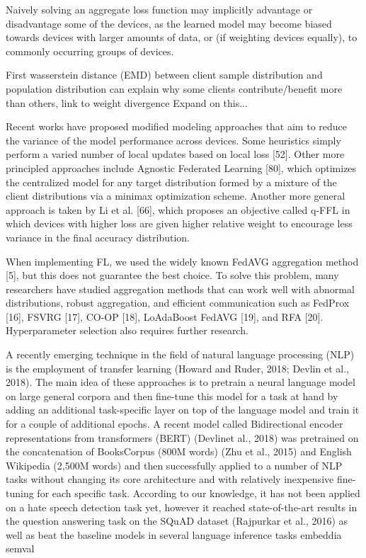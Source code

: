 \documentclass[letterpaper]{article} %
\begin{document}
Naively solving an aggregate loss function may implicitly advantage or disadvantage some of the devices, as the learned model may become biased towards devices with larger amounts of data, or (if weighting devices equally), to commonly occurring groups of devices. 

First wasserstein distance (EMD) between client sample distribution and population distribution can explain why some clients contribute/benefit more than others, link to weight divergence Expand on this...

Recent works have proposed modified modeling approaches that aim to reduce the variance of the model performance across devices. Some heuristics simply perform a varied number of local updates based
on local loss [52]. Other more principled approaches include Agnostic Federated Learning [80], which optimizes the centralized model for any target distribution formed by a mixture of the client distributions via a minimax optimization scheme. Another more general approach is taken by Li et al. [66], which proposes an objective called q-FFL in which devices with higher loss are given higher relative weight to encourage less variance in the final accuracy distribution.

When implementing FL, we used the
widely known FedAVG aggregation method [5], but this does
not guarantee the best choice. To solve this problem, many
researchers have studied aggregation methods that can work
well with abnormal distributions, robust aggregation, and
efficient communication such as FedProx [16], FSVRG [17],
CO-OP [18], LoAdaBoost FedAVG [19], and RFA [20].
Hyperparameter selection also requires further research.

A recently emerging technique in the field of natural language processing (NLP) is the employment of transfer learning (Howard and Ruder, 2018; Devlin et al., 2018). The main idea of these approaches is to pretrain a neural language model on large general corpora and then fine-tune this model for a task at hand by adding an additional task-specific layer on top of the language model and train it for a couple of additional epochs. A recent model called Bidirectional encoder representations from transformers (BERT) (Devlinet al., 2018) was pretrained on the concatenation of BooksCorpus (800M words) (Zhu et al., 2015) and English Wikipedia (2,500M words) and then successfully applied to a number of NLP tasks without changing its core architecture and with relatively inexpensive fine-tuning for each specific task. According to our knowledge, it has not been applied on a hate speech detection task yet, however it reached state-of-the-art results in the question answering task on the SQuAD dataset (Rajpurkar et al., 2016) as well as beat the baseline models in several language inference tasks embeddia semval
\end{document}
